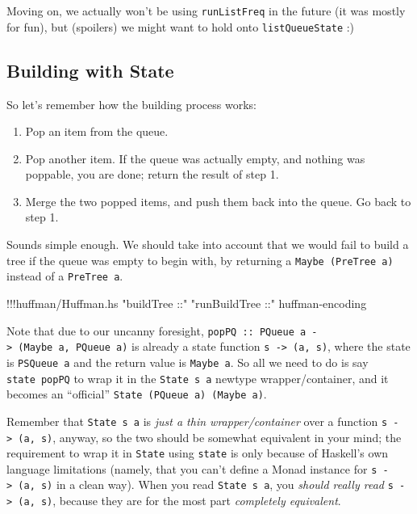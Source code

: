 \documentclass[]{article}
\newenvironment{Shaded}{}{}
\newcommand{\StringTok}[1]{\textcolor[rgb]{0.25,0.44,0.63}{{#1}}}
\newcommand{\FunctionTok}[1]{\textcolor[rgb]{0.02,0.16,0.49}{{#1}}}
\newcommand{\NormalTok}[1]{{#1}}
\begin{document}
Moving on, we actually won't be using \texttt{runListFreq} in the future
(it was mostly for fun), but (spoilers) we might want to hold onto
\texttt{listQueueState} :)

\subsection{Building with State}\label{building-with-state}

So let's remember how the building process works:

\begin{enumerate}
\def\labelenumi{\arabic{enumi}.}
\tightlist
\item
  Pop an item from the queue.
\item
  Pop another item. If the queue was actually empty, and nothing was
  poppable, you are done; return the result of step 1.
\item
  Merge the two popped items, and push them back into the queue. Go back
  to step 1.
\end{enumerate}

Sounds simple enough. We should take into account that we would fail to
build a tree if the queue was empty to begin with, by returning a
\texttt{Maybe\ (PreTree\ a)} instead of a \texttt{PreTree\ a}.

\begin{Shaded}
\begin{Highlighting}[]
\FunctionTok{!!!}\NormalTok{huffman}\FunctionTok{/}\NormalTok{Huffman.hs }\StringTok{"buildTree ::"} \StringTok{"runBuildTree ::"} \NormalTok{huffman}\FunctionTok{-}\NormalTok{encoding}
\end{Highlighting}
\end{Shaded}

Note that due to our uncanny foresight,
\texttt{popPQ\ ::\ PQueue\ a\ -\textgreater{}\ (Maybe\ a,\ PQueue\ a)}
is already a state function \texttt{s\ -\textgreater{}\ (a,\ s)}, where
the state is \texttt{PSQueue\ a} and the return value is
\texttt{Maybe\ a}. So all we need to do is say \texttt{state\ popPQ} to
wrap it in the \texttt{State\ s\ a} newtype wrapper/container, and it
becomes an ``official'' \texttt{State\ (PQueue\ a)\ (Maybe\ a)}.

Remember that \texttt{State\ s\ a} is \emph{just a thin
wrapper/container} over a function \texttt{s\ -\textgreater{}\ (a,\ s)},
anyway, so the two should be somewhat equivalent in your mind; the
requirement to wrap it in \texttt{State} using \texttt{state} is only
because of Haskell's own language limitations (namely, that you can't
define a Monad instance for \texttt{s\ -\textgreater{}\ (a,\ s)} in a
clean way). When you read \texttt{State\ s\ a}, you \emph{should really
read} \texttt{s\ -\textgreater{}\ (a,\ s)}, because they are for the
most part \emph{completely equivalent}.
\end{document}
